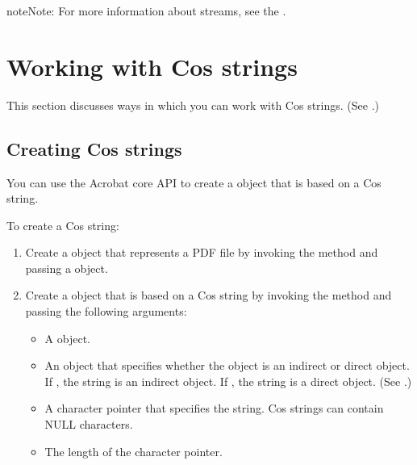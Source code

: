 \documentclass[letterpaper,12pt,english,openany,oneside]{sphinxmanual}
\begin{document}
\begin{sphinxadmonition}{note}{Note:}
For more information about streams, see the .
\end{sphinxadmonition}


\section{Working with Cos strings}
\label{\detokenize{Plugins_Cos:working-with-cos-strings}}
This section discusses ways in which you can work with Cos strings. (See .)


\subsection{Creating Cos strings}
\label{\detokenize{Plugins_Cos:creating-cos-strings}}
You can use the Acrobat core API to create a  object that is based on a Cos string.

To create a Cos string:
\begin{enumerate}
%
\item {} 
Create a  object that represents a PDF file by invoking the  method and passing a  object.

\item {} 
Create a  object that is based on a Cos string by invoking the  method and passing the following arguments:
\begin{itemize}
\item {} 
A  object.

\item {} 
An  object that specifies whether the  object is an indirect or direct object. If , the string is an indirect object. If , the string is a direct object. (See .)

\item {} 
A character pointer that specifies the string. Cos strings can contain NULL characters.

\item {} 
The length of the character pointer.

\end{itemize}

\end{enumerate}
\end{document}
